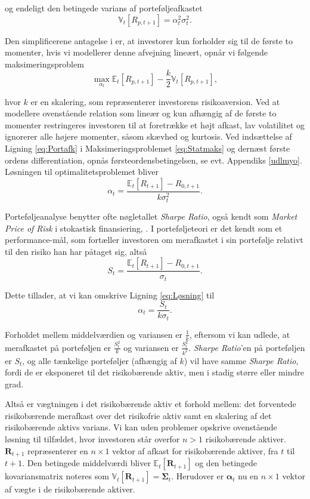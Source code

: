 \documentclass[
  a4paper,
  oneside]{memoir}
\begin{document}
og endeligt den betingede varians af porteføljeafkastet
\begin{equation}
\mathbb{V}_t\left[R_{p,t+1}\right]=\alpha_t^2\sigma_t^2.\label{eq:Varport}
\end{equation}

Den simplificerene antagelse i \citep{Markowitz1952} er, at investorer kun forholder sig til de første to momenter, hvis vi modellerer denne afvejning lineært, opnår vi følgende maksimeringsproblem
\begin{equation}
\max_{\alpha_t} \mathbb{E}_t\left[R_{p,t+1}\right] -\frac{k}{2} \mathbb{V}_t\left[R_{p,t+1}\right],\label{eq:Statmaks}
\end{equation}

hvor \(k\) er en skalering, som repræsenterer investorens risikoaversion. Ved at modellere ovenstående relation som lineær og kun afhængig af de første to momenter restringeres investoren til at foretrække et højt afkast, lav volatilitet og ignorerer alle højere momenter, såsom skævhed og kurtosis. Ved indsættelse af Ligning \eqref{eq:Portafk} i Maksimeringsproblemet \eqref{eq:Statmaks} og dernæst første ordens differentiation, opnås førsteordensbetingelsen, se evt. Appendiks \ref{udlmyo}. Løsningen til optimalitetsproblemet bliver
\begin{equation}
\alpha_t = \frac{\mathbb{E}_t\left[R_{t+1}\right]-R_{0,t+1}}{k\sigma_t^2}.\label{eq:Løsning}
\end{equation}

Porteføljeanalyse benytter ofte nøgletallet \emph{Sharpe Ratio}, også kendt som \emph{Market Price of Risk} i stokastisk finansiering, \citep{Bjork2009}. I porteføljeteori er det kendt som et performance-mål, som fortæller investoren om merafkastet i sin portefølje relativt til den risiko han har påtaget sig, altså
\[S_t=\frac{\mathbb{E}_t\left[R_{t+1}\right]-R_{0,t+1}}{\sigma_t}.\]

Dette tillader, at vi kan omskrive Ligning \eqref{eq:Løsning} til
\[\alpha_t=\frac{S_t}{k\sigma_t}.\]

Forholdet mellem middelværdien og variansen er \(\tfrac{1}{k}\), eftersom vi kan udlede, at merafkastet på porteføljen er \(\tfrac{S_t^2}{k}\) og variansen er \(\tfrac{S_t^2}{k^2}\). \emph{Sharpe Ratio}'en på porteføljen er \(S_t\), og alle tænkelige porteføljer (afhængig af \(k\)) vil have samme \emph{Sharpe Ratio}, fordi de er eksponeret til det risikobærende aktiv, men i stadig større eller mindre grad.

Altså er vægtningen i det risikobærende aktiv et forhold mellem: det forventede risikobærende merafkast over det risikofrie aktiv samt en skalering af det risikobærende aktivs varians. Vi kan uden problemer opskrive ovenstående løsning til tilfældet, hvor investoren står overfor \(n>1\) risikobærende aktiver. \(\bm{R}_{t+1}\) repræsenterer en \(n\times 1\) vektor af afkast for risikobærende aktiver, fra \(t\) til \(t+1\). Den betingede middelværdi bliver \(\mathbb{E}_t\left[\bm{R}_{t+1}\right]\) og den betingede kovariansmatrix noteres som \(\mathbb{V}_t\left[\bm{R}_{t+1}\right]=\bm{\Sigma}_t\). Herudover er \(\bm{\alpha}_t\) nu en \(n\times 1\) vektor af vægte i de risikobærende aktiver.
\end{document}
